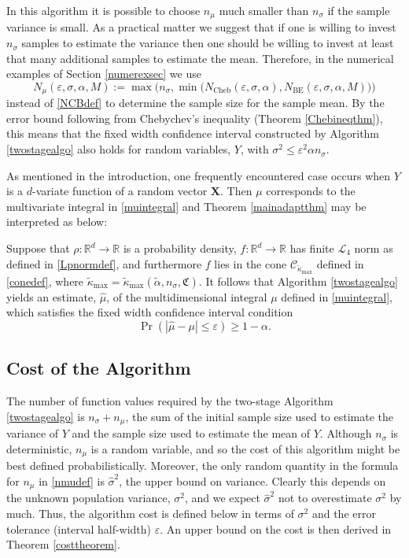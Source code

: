 \documentclass[graybox]{svmult}
\newcommand{\fudge}{\mathfrak{C}}
\newcommand\reals{\mathbb{R}}
\newcommand{\vX}{\boldsymbol{X}}
\newcommand{\hsigma}{\hat{\sigma}}
\newcommand{\tkappa}{\tilde{\kappa}}
\newcommand{\cc}{\mathcal{C}}
\newcommand{\cl}{\mathcal{L}}
\begin{document}
\begin{remark} In this algorithm it is possible to choose $n_{\mu}$ much smaller than  $n_\sigma$ if the sample variance is small.  As a practical matter we suggest that if one is willing to invest $n_\sigma$ samples to estimate the variance then one should be willing to invest at least that many additional samples to estimate the mean.  Therefore, in the numerical examples of Section \ref{numerexsec} we use
\begin{equation} \label{NCBpracticaldef}
N_{\mu}(\varepsilon,\sigma,\alpha,M) 
:= \max\bigl( n_{\sigma}, \min\bigl(N_{\text{Cheb}}(\varepsilon,\sigma,\alpha), 
N_{\text{BE}}(\varepsilon,\sigma,\alpha,M) \bigr) \bigr)
\end{equation} 
instead of \eqref{NCBdef} to determine the sample size for the sample mean.  By the error bound following from Chebychev's inequality (Theorem \ref{Chebineqthm}), this means that the fixed width confidence interval constructed by Algorithm \ref{twostagealgo} also holds for random variables, $Y$, with $\sigma^2 \le \varepsilon^2 \alpha n_{\sigma}$.
\end{remark}

\bigskip

As mentioned in the introduction, one frequently encountered case occurs when  $Y$ is a $d$-variate function of a random vector $\vX$. Then $\mu$ corresponds to the multivariate integral in \eqref{muintegral} and Theorem \ref{mainadaptthm} may be interpreted as below:

\begin{corollary} \label{integcor} Suppose that $\rho:\reals^d \to \reals$ is a probability density, $f: \reals^d \to \reals$ has finite $\cl_4$ norm as defined in \eqref{Lpnormdef}, and furthermore $f$ lies in the cone $\cc_{\tkappa_{\max}}$ defined in \eqref{conedef}, where $\tkappa_{\max}=\tilde\kappa_{\max}(\tilde\alpha,n_\sigma,\fudge)$.  It follows that Algorithm  \ref{twostagealgo}  yields an estimate,
$\hat\mu$, of the multidimensional integral $\mu$ defined in \eqref{muintegral}, which satisfies the fixed width confidence interval condition
$$\Pr( |\hat\mu-\mu|\le\varepsilon)\ge 1-\alpha.$$
\end{corollary}


\subsection{Cost of the Algorithm}  The number of function values required by the two-stage Algorithm \ref{twostagealgo} is $n_{\sigma}+n_\mu$, the sum of the initial sample size used to estimate the variance of $Y$ and the sample size used to estimate the mean of $Y$.  Although $n_{\sigma}$ is deterministic, $n_\mu$ is a random variable, and so the cost of this algorithm might be best defined probabilistically.  Moreover, the only random quantity in the formula for $n_{\mu}$ in \eqref{nmudef} is $\hsigma^2$, the upper bound on variance.  Clearly this depends on the unknown population variance, $\sigma^2$, and we expect $\hsigma^2$ not to overestimate $\sigma^2$ by much.  Thus, the algorithm cost is defined below in terms of $\sigma^2$ and the error tolerance (interval half-width) $\varepsilon$.  An upper bound on the cost is then derived in Theorem \ref{costtheorem}.
\end{document}

